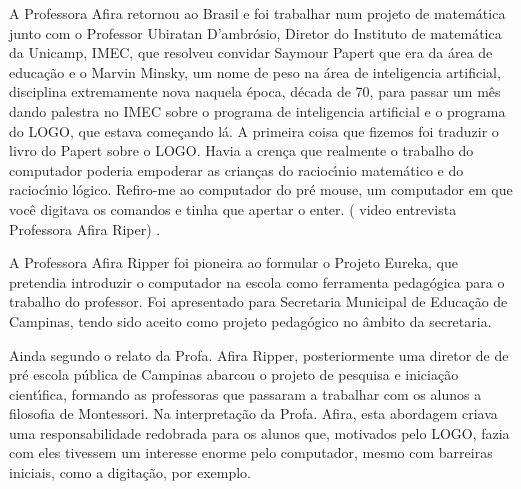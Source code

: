 \documentclass[
12pt,		%
openright,	%
twoside,  %
a4paper,			%
chapter=TITLE,		%
english,			%
french,				%
spanish,			%
brazil				%
]{USPSC-classe/USPSC}
\begin{document}
A Professora Afira  retornou ao  Brasil e foi trabalhar num  projeto de matem\'atica junto com o Professor  Ubiratan D’ambr\'osio, Diretor do  Instituto de matem\'atica da Unicamp, IMEC, que resolveu convidar Saymour Papert que era da \'area de educa\c{c}\~ao e o Marvin Minsky,  um nome de peso na \'area de inteligencia artificial, disciplina extremamente nova naquela \'epoca, d\'ecada de 70, para passar um m\^es dando palestra  no IMEC sobre o programa de inteligencia artificial e o programa do LOGO, que estava come\c{c}ando l\'a.  A primeira coisa que fizemos foi traduzir o livro do Papert sobre o LOGO.  Havia a cren\c{c}a que realmente o trabalho do computador  poderia empoderar as crian\c{c}as do racioc\'{\i}nio matem\'atico e do racioc\'{\i}nio l\'ogico. Refiro-me ao computador do pr\'e mouse, um computador  em que voc\^e digitava os comandos e tinha que apertar o enter. ( video entrevista Professora Afira Riper) .\textquotedbl 














A Professora Afira Ripper foi pioneira ao formular o Projeto Eureka, que pretendia introduzir o computador na escola como ferramenta pedag\'ogica para o trabalho do professor. Foi apresentado para  Secretaria Municipal de Educa\c{c}\~ao de Campinas, tendo sido aceito como projeto pedag\'ogico no \^ambito da secretaria.














Ainda segundo o relato da Profa. Afira Ripper, posteriormente uma diretor de de pr\'e escola p\'ublica de Campinas abarcou  o projeto de pesquisa e inicia\c{c}\~ao cient\'{\i}fica, formando as professoras que passaram a trabalhar com os alunos  a filosofia de Montessori. Na interpreta\c{c}\~ao da Profa. Afira, esta abordagem criava uma responsabilidade redobrada para os alunos que, motivados pelo LOGO, fazia com eles tivessem um interesse enorme pelo computador, mesmo com barreiras iniciais, como a digita\c{c}\~ao, por exemplo.
\end{document}
